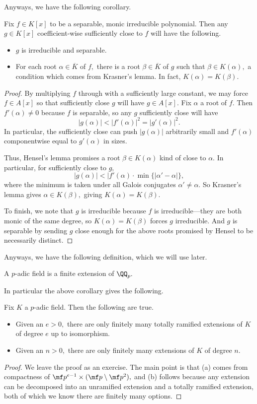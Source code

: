 Anyways, we have the following corollary.
\begin{corollary}[Krasner]
	Fix $f\in K[x]$ to be a separable, monic irreducible polynomial. Then any $g\in K[x]$ coefficient-wise sufficiently close to $f$ will have the following.
	\begin{itemize}
		\item $g$ is irreducible and separable.
		\item For each root $\alpha\in\overline K$ of $f,$ there is a root $\beta\in\overline K$ of $g$ such that $\beta\in K(\alpha),$ a condition which comes from Krasner's lemma. In fact, $K(\alpha)=K(\beta).$
	\end{itemize}
\end{corollary}
\begin{proof}
	By multiplying $f$ through with a sufficiently large constant, we may force $f\in A[x]$ so that sufficiently close $g$ will have $g\in A[x].$ Fix $\alpha$ a root of $f.$ Then $f'(\alpha)\ne0$ because $f$ is separable, so any $g$ sufficiently close will have
	\[|g(\alpha)|<|f'(\alpha)|^2=|g'(\alpha)|^2.\]
	In particular, the sufficiently close can push $|g(\alpha)|$ arbitrarily small and $f'(\alpha)$ componentwise equal to $g'(\alpha)$ in sizes.

	Thus, Hensel's lemma promises a root $\beta\in K(\alpha)$ kind of close to $\alpha.$ In particular, for sufficiently close to $g,$
	\[|g(\alpha)|<|f'(\alpha)\cdot\min\{|\alpha'-\alpha|\},\]
	where the minimum is taken under all Galois conjugates $\alpha'\ne\alpha.$ So Krasner's lemma gives $\alpha\in K(\beta),$ giving $K(\alpha)=K(\beta).$

	To finish, we note that $g$ is irreducible because $f$ is irreducible---they are both monic of the same degree, so $K(\alpha)=K(\beta)$ forces $g$ irreducible. And $g$ is separable by sending $g$ close enough for the above roots promised by Hensel to be necessarily distinct.
\end{proof}
Anyways, we have the following definition, which we will use later.
\begin{definition}
	A $p$-adic field is a finite extension of $\QQ_p.$
\end{definition}
In particular the above corollary gives the following.
\begin{corollary}
	Fix $K$ a $p$-adic field. Then the following are true.
	\begin{itemize}
		\item Given an $e>0,$ there are only finitely many totally ramified extensions of $K$ of degree $e$ up to isomorphism.
		\item Given an $n>0,$ there are only finitely many extensions of $K$ of degree $n.$
	\end{itemize}
\end{corollary}
\begin{proof}
	We leave the proof as an exercise. The main point is that (a) comes from compactness of $\mf p^{e-1}\times(\mf p\setminus\mf p^2),$ and (b) follows because any extension can be decomposed into an unramified extension and a totally ramified extension, both of which we know there are finitely many options.
\end{proof}